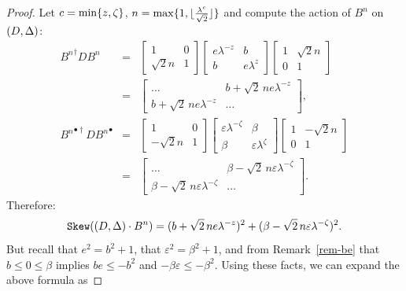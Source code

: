 \begin{proof}
Let $c=\min\{z, \zeta\}$, 
$n=\max\{1, \lfloor\frac{\lambda^{c}}{\sqrt{2}}\rfloor\}$ 
and compute the action of $B^n$ on $(D,\Delta)$:
\[
\begin{array}{lcl}
{B^n}^\dagger DB^n & = & \left[ \begin{array} {cc} 
1 & 0  \\
\sqrt{2}n & 1
\end{array} \right]
\left[ \begin{array} {cc} 
e{\lambda^{-z}} & b \\
b & e{\lambda^{z}}
\end{array} \right]
\left[ \begin{array} {cc} 
1 & \sqrt{2}n  \\
0 & 1
\end{array} \right] \\[9pt]
& = & \left[ \begin{array} {cc} 
\ldots & b+\sqrt{2}\,ne{\lambda^{-z}}  \\
b+\sqrt{2}\,ne{\lambda^{-z}} & \ldots
\end{array} \right], \\[18pt]
{B^n}^{\bullet\dagger} D{B^n}^\bullet & = & \left[ \begin{array} {cc} 
1 & 0  \\
-\sqrt{2}n & 1
\end{array} \right]
\left[ \begin{array} {cc} 
\varepsilon{\lambda^{-\zeta}} & \beta \\
\beta & \varepsilon{\lambda^{\zeta}}
\end{array} \right]
\left[ \begin{array} {cc} 
1 & -\sqrt{2}n  \\
0 & 1
\end{array} \right] \\[9pt]
& = & \left[ \begin{array} {cc} 
\ldots & \beta-\sqrt{2}\,n\varepsilon{\lambda^{-\zeta}}  \\
\beta-\sqrt{2}\,n\varepsilon{\lambda^{-\zeta}} & \ldots
\end{array} \right].
\end{array}
\]
Therefore:
\[
\mathtt{Skew}((D,\Delta)\cdot B^n) = (b+\sqrt{2}\,ne{\lambda^{-z}})^2+
(\beta-\sqrt{2}\,n\varepsilon{\lambda^{-\zeta}})^2.
\]
But recall that $e^2=b^2+1$, that 
$\varepsilon^2=\beta^2+1$, and from Remark~\ref{rem-be} that 
$b\leq 0\leq \beta$ implies $be\leq -b^2$ and 
$-\beta\varepsilon\leq -\beta^2$. Using these 
facts, we can expand the above formula as 

\end{proof}
